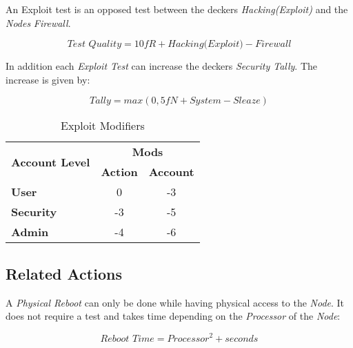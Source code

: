 An Exploit test is an opposed test between the deckers \emph{Hacking(Exploit)} and
the \emph{Nodes} \emph{Firewall}.

\begin{equation*}
    \textit{Test Quality} = \textit{10fR} + \textit{Hacking(Exploit)} - \textit{Firewall}
\end{equation*}

In addition each \emph{Exploit Test} can increase the deckers \emph{Security Tally}.
The increase is given by:

\begin{equation*}
    \textit{Tally} = max(0, \textit{5fN} + \textit{System} - \textit{Sleaze})
\end{equation*}

\begin{table}[htb]
    \caption[Exploit Modifiers]{Exploit Modifiers}
    \label{tab:exploit mods}
    \centering
    \begin{tabular}{lcc}
        \toprule
        \multirow{2}{*}{\textbf{Account Level}} & \multicolumn{2}{c}{\textbf{Mods}}                    \\
        \cmidrule{2-3}
        {}                                      & \textbf{Action}                   & \textbf{Account} \\
        \midrule
        \textbf{User}                           & 0                                 & -3               \\
        \textbf{Security}                       & -3                                & -5               \\
        \textbf{Admin}                          & -4                                & -6               \\
        \bottomrule
    \end{tabular}
\end{table}

\subsection{Related Actions}


A \emph{Physical Reboot} can only be done while having physical access to the
\emph{Node}. It does not require a test and takes time depending on the
\emph{Processor} of the \emph{Node}:

\begin{equation*}
    \textit{Reboot Time} = \textit{Processor}^2 + \textit{seconds}
\end{equation*}

